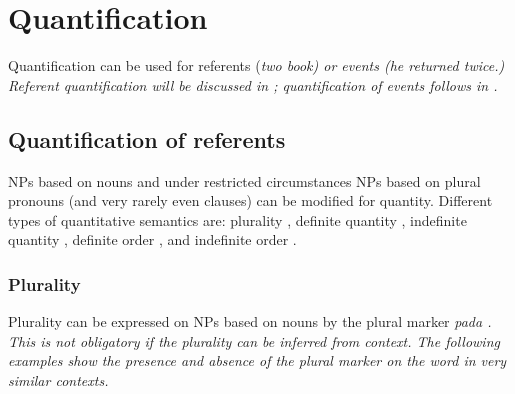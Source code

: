 %
%



\section{Quantification}\label{sec:func:Quantity}
Quantification can be used for referents (\em two book\em) or events (\em he returned twice\em.)  Referent quantification will be discussed in  ;  quantification of events follows in  .

\subsection{Quantification of referents}\label{sec:func:Referentquantification}
NPs based on nouns and under restricted circumstances NPs  based on plural pronouns (and very rarely even clauses) can be modified for quantity. Different types of quantitative semantics are:
plurality ,
definite quantity ,
indefinite quantity ,
definite order , and
indefinite order .


\subsubsection{Plurality} \label{sec:func:mod:Plurality}
Plurality can be expressed on NPs based on nouns by the plural marker \em pada \em {}. This is not obligatory if the plurality can be inferred from context.
The following examples show the presence and absence of the plural marker on the word  in very similar contexts.

